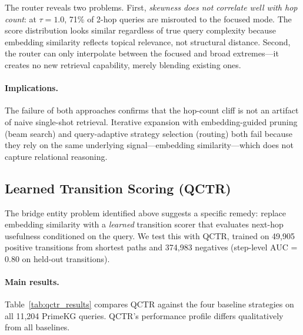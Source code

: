 \documentclass[11pt]{article}
\begin{document}
The router reveals two problems. First, \textit{skewness does not correlate well with hop count}: at $\tau = 1.0$, 71\% of 2-hop queries are misrouted to the focused mode. The score distribution looks similar regardless of true query complexity because embedding similarity reflects topical relevance, not structural distance. Second, the router can only interpolate between the focused and broad extremes---it creates no new retrieval capability, merely blending existing ones.

\paragraph{Implications.} The failure of both approaches confirms that the hop-count cliff is not an artifact of naive single-shot retrieval. Iterative expansion with embedding-guided pruning (beam search) and query-adaptive strategy selection (routing) both fail because they rely on the same underlying signal---embedding similarity---which does not capture relational reasoning.

\subsection{Learned Transition Scoring (QCTR)}

The bridge entity problem identified above suggests a specific remedy: replace embedding similarity with a \textit{learned} transition scorer that evaluates next-hop usefulness conditioned on the query. We test this with QCTR, trained on 49,905 positive transitions from shortest paths and 374,983 negatives (step-level AUC = 0.80 on held-out transitions).

\paragraph{Main results.} Table~\ref{tab:qctr_results} compares QCTR against the four baseline strategies on all 11,204 PrimeKG queries. QCTR's performance profile differs qualitatively from all baselines.
\end{document}

